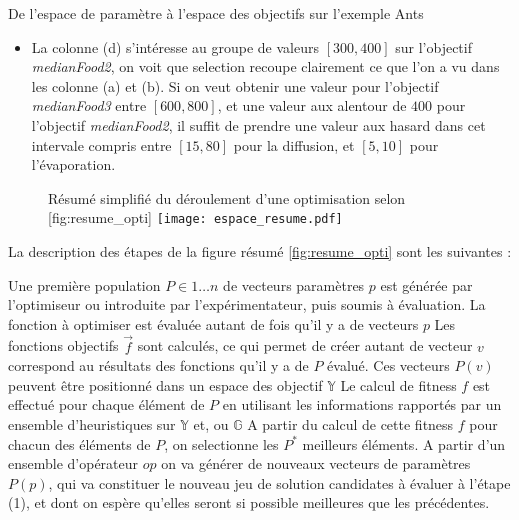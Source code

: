 \begin{framewithtitle}[]{De l'espace de paramètre à l'espace des objectifs sur l'exemple Ants }
\begin{itemize}[noitemsep,nolistsep]
	\item La colonne (d) s'intéresse au groupe de valeurs $[300, 400]$ sur l'objectif  \textit{medianFood2}, on voit que selection recoupe clairement ce que l'on a vu dans les colonne (a) et (b). Si on veut obtenir une valeur pour l'objectif \textit{medianFood3} entre $[600, 800]$, et une valeur aux alentour de $400$ pour l'objectif \textit{medianFood2}, il suffit de prendre une valeur aux hasard dans cet intervale compris entre $[15, 80]$  pour la diffusion, et $[5, 10]$ pour l'évaporation.
\end{itemize}

\end{framewithtitle}


\begin{figure}[!ht]
	\begin{sidecaption}[fortoc]{Résumé simplifié du déroulement d'une optimisation selon \textcite[109]{Weise2011}}[fig:resume_opti]
		\centering
		\texttt{[image: espace\_resume.pdf]}{
		}
  \end{sidecaption}
\end{figure}

La description des étapes de la figure résumé \ref{fig:resume_opti} sont les suivantes :

\begin{itemize}[label=\textbullet]
	 Une première population $P \in {1 \dotsc n}$ de vecteurs paramètres ${p}$ est générée par l'optimiseur ou introduite par l'expérimentateur, puis soumis à évaluation.
	 La fonction à optimiser est évaluée autant de fois qu'il y a de vecteurs ${p}$
	 Les fonctions objectifs $\vec{f}$ sont calculés, ce qui permet de créer autant de vecteur ${v}$ correspond au résultats des fonctions qu'il y a de $P$ évalué. Ces vecteurs $P(v)$ peuvent être positionné dans un espace des objectif $\mathbb{Y}$
	 Le calcul de fitness $f$ est effectué pour chaque élément de $P$ en utilisant les informations rapportés par un ensemble d'heuristiques sur $\mathbb{Y}$ et, ou $\mathbb{G}$
	 A partir du calcul de cette fitness $f$ pour chacun des éléments de $P$, on selectionne les $P^*$ meilleurs éléments.
	 A partir d'un ensemble d'opérateur ${op}$ on va générer de nouveaux vecteurs de paramètres $P(p)$, qui va constituer le nouveau jeu de solution candidates à évaluer à l'étape (1), et dont on espère qu'elles seront si possible meilleures que les précédentes.
\end{itemize}












